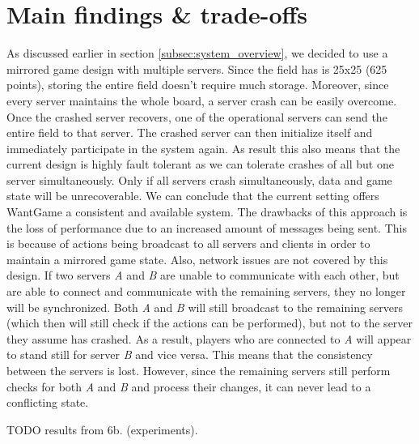 \section{Main findings \& trade-offs}


	As discussed earlier in section \ref{subsec:system_overview}, we decided to use a mirrored game design with multiple servers. 
	Since the field has is 25x25 (625 points), storing the entire field doesn't require much storage. 
	Moreover, since every server maintains the whole board, a server crash can be easily overcome.
	Once the crashed server recovers, one of the operational servers can send the entire field to that server. 
	The crashed server can then initialize itself and immediately participate in the system again. 
	As result this also means that the current design is highly fault tolerant as we can tolerate crashes of all but one server simultaneously. 
	Only if all servers crash simultaneously, data and game state will be unrecoverable.
	We can conclude that the current setting offers WantGame a consistent and available system. 
	The drawbacks of this approach is the loss of performance due to an increased amount of messages being sent. 
	This is because of actions being broadcast to all servers and clients in order to maintain a mirrored game state. 
	Also, network issues are not covered by this design. 
	If two servers \emph{A} and \emph{B} are unable to communicate with each other, but are able to connect and communicate with the remaining servers, they no longer will be synchronized. 
	Both \emph{A} and \emph{B} will still broadcast to the remaining servers (which then will still check if the actions can be performed), but not to the server they assume has crashed. 
	As a result, players who are connected to \emph{A} will appear to stand still for server \emph{B} and vice versa. This means that the consistency between the servers is lost. However, since the remaining servers still perform checks for both \emph{A} and \emph{B} and process their changes, it can never lead to a conflicting state.
	
	TODO results from 6b. (experiments).